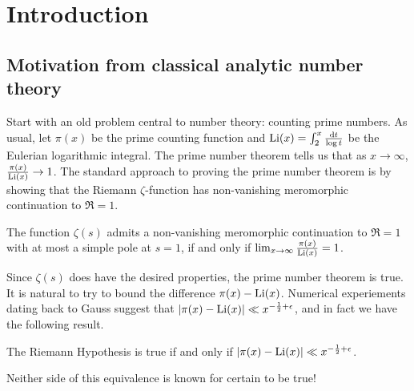 
\chapter{Introduction}





\section{Motivation from classical analytic number theory}

Start with an old problem central to number theory: counting 
prime numbers. As usual, let $\pi(x)$ be the prime counting function and 
$\operatorname{Li}(x) = \int_2^x \frac{\mathrm{d} t}{\log t}$ be the Eulerian logarithmic integral. 
The prime number theorem tells us that as $x\to \infty$, 
$\frac{\pi(x)}{\operatorname{Li}(x)} \to 1$. The standard approach 
to proving the prime number theorem is by showing that the Riemann 
$\zeta$-function has non-vanishing meromorphic continuation to $\Re = 1$.

\begin{theorem}
The function $\zeta(s)$ admits a non-vanishing meromorphic continuation to 
$\Re = 1$ with at most a simple pole at $s=1$, if and only if 
$\lim_{x\to \infty} \frac{\pi(x)}{\operatorname{Li}(x)} = 1$. 
\end{theorem}

Since $\zeta(s)$ does have the desired properties, the prime number 
theorem is true. It is natural to try to bound the difference 
$\pi(x) - \operatorname{Li}(x)$. Numerical experiements dating back to Gauss 
suggest that $|\pi(x) - \operatorname{Li}(x)| \ll x^{-\frac 1 2+\epsilon}$, and in fact we 
have the following result. 

\begin{theorem}
The Riemann Hypothesis is true if and only if 
$|\pi(x) - \operatorname{Li}(x)| \ll x^{-\frac 1 2+\epsilon}$. 
\end{theorem}

Neither side of this equivalence is known for certain to be true! 

